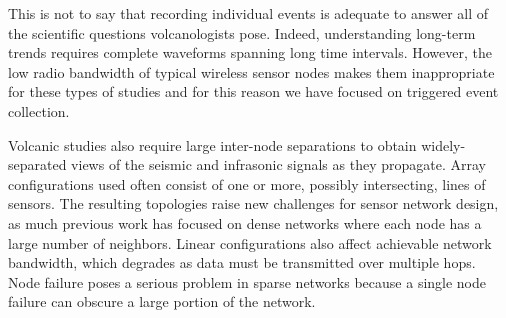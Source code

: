 This is not to say that recording individual events is adequate to answer all
of the scientific questions volcanologists pose.  Indeed, understanding
long-term trends requires complete waveforms spanning long time intervals.
However, the low radio bandwidth of typical wireless sensor nodes makes them
inappropriate for these types of studies and for this reason we have focused
on triggered event collection.


Volcanic studies also require large inter-node separations to obtain
widely-separated views of the seismic and infrasonic signals as they
propagate.  Array configurations used often consist of one or more, possibly
intersecting, lines of sensors. The resulting topologies raise new challenges
for sensor network design, as much previous work has focused on dense
networks where each node has a large number of neighbors.  Linear
configurations also affect achievable network bandwidth, which degrades as
data must be transmitted over multiple hops.  Node failure poses a serious
problem in sparse networks because a single node failure can obscure a
large portion of the network.
